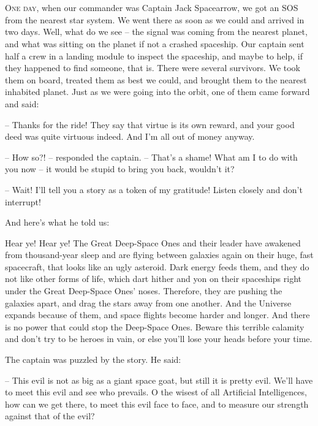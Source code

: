 \documentclass[ebook,oneside,final,openright]{memoir}
\begin{document}
\chapter{}
\par
\lettrine{O}{ne day,} when our commander was Captain Jack Spacearrow, we got an SOS from the nearest star system. We went there as soon as we could and arrived in two days. Well, what do we see – the signal was coming from the nearest planet, and what was sitting on the planet if not a crashed spaceship. Our captain sent half a crew in a landing module to inspect the spaceship, and maybe to help, if they happened to find someone, that is. There were several survivors. We took them on board, treated them as best we could, and brought them to the nearest inhabited planet. Just as we were going into the orbit, one of them came forward and said: \par
\par
– Thanks for the ride! They say that virtue is its own reward, and your good deed was quite virtuous indeed. And I’m all out of money anyway.\par
– How so?! – responded the captain. – That’s a shame! What am I to do with you now – it would be stupid to bring you back, wouldn’t it? \par
– Wait! I’ll tell you a story as a token of my gratitude! Listen closely and don’t interrupt! \par
 And here’s what he told us:\par
\par
Hear ye! Hear ye! The Great Deep-Space Ones and their leader have awakened from thousand-year sleep and are flying between galaxies again on their huge, fast spacecraft, that looks like an ugly asteroid. Dark energy feeds them, and they do not like other forms of life, which dart hither and yon on their spaceships right under the Great Deep-Space Ones’ noses. Therefore, they are pushing the galaxies apart, and drag the stars away from one another. And the Universe expands because of them, and space flights become harder and longer. And there is no power that could stop the Deep-Space Ones. Beware this terrible calamity and don’t try to be heroes in vain, or else you’ll lose your heads before your time.\par
\par
The captain was puzzled by the story. He said:\par
– This evil is not as big as a giant space goat, but still it is pretty evil. We’ll have to meet this evil and see who prevails. O the wisest of all Artificial Intelligences, how can we get there, to meet this evil face to face, and to measure our strength against that of the evil?\par
\end{document}
